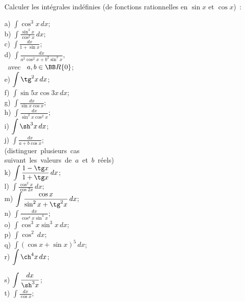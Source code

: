 \documentclass[12pt,french,oneside,a4paper]{memoir} %
\begin{document}
\begin{exo}
Calculer les intégrales indéfinies (de fonctions
rationnelles en $\sin x$ et $\cos x$)~:\\

\hfill
\begin{minipage}[t]{6cm}
a) $\displaystyle{\int\cos^3x\,dx}$;\\[2mm]
b) $\displaystyle{\int\frac{\sin^3x}{\cos^2x}\,dx}$;\\[2mm]
c) $\displaystyle{\int\frac{dx}{1+\sin x}}$;\\[2mm]
d) $\displaystyle{\int\frac{dx}{a^2\cos^2x+b^2\sin^2x}}$,\\[2mm]
\phantom{d)} \mbox{ avec } $a, b\in{\BB R}\{0\}$;\\[2mm]
e) $\displaystyle{\int\tg^2x\,dx}$;\\[2mm]
f) $\displaystyle{\int\sin 5x\cos 3x\,dx}$;\\[2mm]
g) $\displaystyle{\int\frac{dx}{\sin x\cos x}}$;\\[2mm]
h) $\displaystyle{\int\frac{dx}{\sin^2 x\cos^2 x}}$;\\[2mm]
i) $\displaystyle{\int\sh^3x\,dx}$;\\[2mm]
j) $\displaystyle{\int\frac{dx}{a+b\cos x}}$;\\[4mm]
\phantom{i) }\mbox{(distinguer plusieurs
cas }\\[2mm]
\phantom{j) }\mbox{suivant les valeurs de $a$ et $b$
réels)}\\[4mm]
k) $\displaystyle{\int\frac{1-\tg x}{1+\tg x}\,dx}$;\\[2mm]
l) $\displaystyle{\int\frac{\cos^2x}{\cos 2x}\,dx}$;\\[2mm]
m) $\displaystyle{\int\frac{\cos x}{\sin^2x+\tg^2x}\,dx}$;\\[2mm]
n) $\displaystyle{\int\frac{dx}{\cos^4 x\sin^4 x}}$;\\[2mm]
o) $\displaystyle{\int\cos^3 x\sin^3 x\,dx}$;\\[2mm]
p) $\displaystyle{\int\cos^2 \,dx}$;\\[2mm]
q) $\displaystyle{\int(\cos x+\sin x)^5\,dx}$;\\[2mm]
r) $\displaystyle{\int\ch^4x\,dx}$;\\[2mm]
\end{minipage}
\hfill
\begin{minipage}[t]{8cm}
s) $\displaystyle{\int\frac{dx}{\sh^3 x}}$;\\[2mm]
t) $\displaystyle{\int\frac{dx}{\cos x}}$;\\[2mm]

\end{minipage}
\end{exo}
\end{document}
